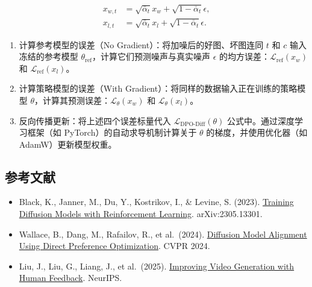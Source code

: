 \[
\begin{aligned}
x_{w,t} &= \sqrt{\bar{\alpha}_t}x_w+\sqrt{1-\bar{\alpha}_t}\epsilon,\\
x_{l,t} &= \sqrt{\bar{\alpha}_t}x_l+\sqrt{1-\bar{\alpha}_t}\epsilon.
\end{aligned}
\]

\begin{enumerate}
\def\labelenumi{\arabic{enumi}.}
\setcounter{enumi}{2}
\tightlist
\item
  计算参考模型的误差（No Gradient）：将加噪后的好图、坏图连同 \(t\) 和 \(c\) 输入冻结的参考模型 \(\theta_{\mathrm{ref}}\)，计算它们预测噪声与真实噪声 \(\epsilon\) 的均方误差：\(\mathcal{L}_{\mathrm{ref}}(x_w)\) 和 \(\mathcal{L}_{\mathrm{ref}}(x_l)\)。
\item
  计算策略模型的误差（With Gradient）：将同样的数据输入正在训练的策略模型 \(\theta\)，计算其预测误差：\(\mathcal{L}_\theta(x_w)\) 和 \(\mathcal{L}_\theta(x_l)\)。
\item
  反向传播更新：将上述四个误差标量代入 \(\mathcal{L}_{\mathrm{DPO}\text{-}\mathrm{Diff}}(\theta)\) 公式中。通过深度学习框架（如 PyTorch）的自动求导机制计算关于 \(\theta\) 的梯度，并使用优化器（如 AdamW）更新模型权重。
\end{enumerate}

\FloatBarrier
{}
\hypertarget{ux53c2ux8003ux6587ux732e-134}{%
\subsection{参考文献}\label{ux53c2ux8003ux6587ux732e-134}}

\vspace{0.25em}
\begin{itemize}
\tightlist
\item
  Black, K., Janner, M., Du, Y., Kostrikov, I., \& Levine, S. (2023). \href{https://arxiv.org/abs/2305.13301}{Training Diffusion Models with Reinforcement Learning}. arXiv:2305.13301.
\item
  Wallace, B., Dang, M., Rafailov, R., et al.~(2024). \href{https://arxiv.org/abs/2311.12908}{Diffusion Model Alignment Using Direct Preference Optimization}. CVPR 2024.
\item
  Liu, J., Liu, G., Liang, J., et al.~(2025). \href{https://arxiv.org/abs/2501.13918}{Improving Video Generation with Human Feedback}. NeurIPS.
\end{itemize}

\clearpage
